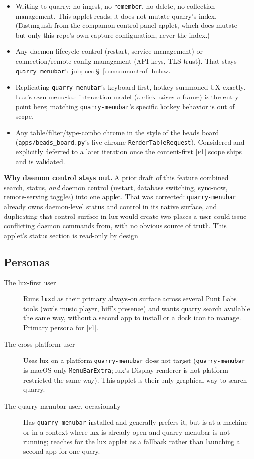 \documentclass[a4paper,11pt]{report}
\newcommand{\pone}{\textsc{[p1]}}
\begin{document}
\begin{itemize}
  \item Writing to quarry: no ingest, no \texttt{remember}, no delete, no
    collection management. This applet reads; it does not mutate quarry's
    index. (Distinguish from the companion control-panel applet, which
    does mutate --- but only this repo's own capture configuration, never
    the index.)
  \item Any daemon lifecycle control (restart, service management) or
    connection/remote-config management (API keys, TLS trust). That stays
    \texttt{quarry-menubar}'s job; see \S~\ref{sec:noncontrol} below.
  \item Replicating \texttt{quarry-menubar}'s keyboard-first, hotkey-summoned
    UX exactly. Lux's own menu-bar interaction model (a click raises a
    frame) is the entry point here; matching \texttt{quarry-menubar}'s
    specific hotkey behavior is out of scope.
  \item Any table/filter/type-combo chrome in the style of the beads
    board (\texttt{apps/beads\_board.py}'s live-chrome \texttt{RenderTableRequest}).
    Considered and explicitly deferred to a later iteration once the
    content-first \pone{} scope ships and is validated.
\end{itemize}

\label{sec:noncontrol}
\textbf{Why daemon control stays out.} A prior draft of this feature
combined search, status, \emph{and} daemon control (restart, database
switching, sync-now, remote-serving toggles) into one applet. That was
corrected: \texttt{quarry-menubar} already owns daemon-level status and
control in its native surface, and duplicating that control surface in lux
would create two places a user could issue conflicting daemon commands
from, with no obvious source of truth. This applet's status section is
read-only by design.

\subsection{Personas}

\begin{description}
  \item[The lux-first user] Runs \texttt{luxd} as their primary always-on
    surface across several Punt Labs tools (vox's music player, biff's
    presence) and wants quarry search available the same way, without a
    second app to install or a dock icon to manage. Primary persona for
    \pone{}.
  \item[The cross-platform user] Uses lux on a platform
    \texttt{quarry-menubar} does not target (\texttt{quarry-menubar} is
    macOS-only \texttt{MenuBarExtra}; lux's Display renderer is not
    platform-restricted the same way). This applet is their only
    graphical way to search quarry.
  \item[The quarry-menubar user, occasionally] Has \texttt{quarry-menubar}
    installed and generally prefers it, but is at a machine or in a
    context where lux is already open and quarry-menubar is not running;
    reaches for the lux applet as a fallback rather than launching a
    second app for one query.
\end{description}
\end{document}
